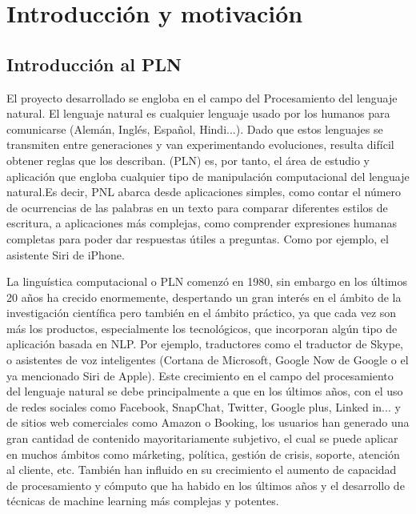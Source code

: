 \chapter{Introducción y motivación}
\label{introducción}
\section{Introducción al PLN}
El proyecto desarrollado se engloba en el campo del Procesamiento del lenguaje natural. El lenguaje natural es cualquier lenguaje usado por los humanos para comunicarse (Alemán, Inglés, Español, Hindi...). Dado que estos lenguajes se transmiten entre generaciones y van experimentando evoluciones, resulta difícil obtener reglas que los describan. (PLN) es, por tanto, el área de estudio y aplicación que engloba cualquier tipo de manipulación computacional del lenguaje natural.\newline Es decir, PNL abarca desde aplicaciones simples, como contar el número de ocurrencias de las palabras en un texto para comparar diferentes estilos de escritura, a aplicaciones más complejas, como comprender expresiones humanas completas para poder dar respuestas útiles a preguntas. \citet{bird2009natural} Como por ejemplo, el asistente Siri de iPhone. 

La linguística computacional o PLN comenzó en 1980, sin embargo en los últimos 20 años ha crecido enormemente, despertando un gran interés en el ámbito de la investigación científica pero también en el ámbito práctico, ya que cada vez son más los productos, especialmente los tecnológicos, que incorporan algún tipo de aplicación basada en NLP. Por ejemplo, traductores como el traductor de Skype, o asistentes de voz inteligentes (Cortana de Microsoft, Google Now de Google o el ya mencionado Siri de Apple). \newline
Este crecimiento en el campo del procesamiento del lenguaje natural se debe principalmente a que en los últimos años, con el uso de redes sociales como Facebook, SnapChat, Twitter, Google plus, Linked in... y de sitios web comerciales como Amazon o Booking, los usuarios han generado una gran cantidad de contenido mayoritariamente subjetivo, el cual se puede aplicar en muchos ámbitos como márketing, política, gestión de crisis, soporte, atención al cliente, etc. También han influido en su crecimiento el aumento de capacidad de procesamiento y cómputo que ha habido en los últimos años y el desarrollo de técnicas de machine learning más complejas y potentes.    
\newline

